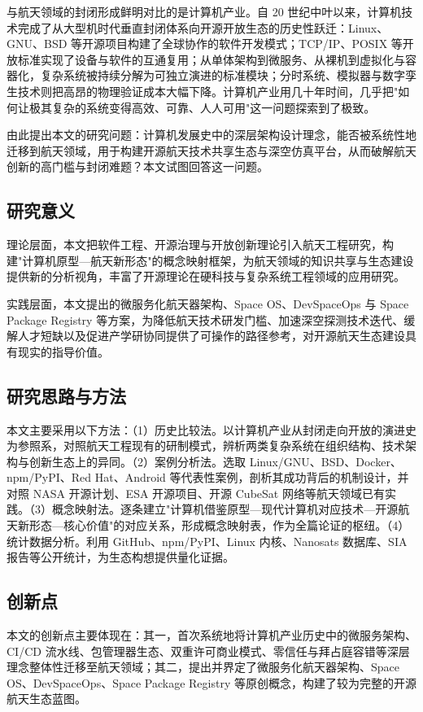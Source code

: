\documentclass[UTF8,a4paper,zihao=-4]{ctexart}
\begin{document}
与航天领域的封闭形成鲜明对比的是计算机产业。自 20 世纪中叶以来，计算机技术完成了从大型机时代垂直封闭体系向开源开放生态的历史性跃迁：Linux、GNU、BSD 等开源项目构建了全球协作的软件开发模式；TCP/IP、POSIX 等开放标准实现了设备与软件的互通复用；从单体架构到微服务、从裸机到虚拟化与容器化，复杂系统被持续分解为可独立演进的标准模块；分时系统、模拟器与数字孪生技术则把高昂的物理验证成本大幅下降。计算机产业用几十年时间，几乎把"如何让极其复杂的系统变得高效、可靠、人人可用"这一问题探索到了极致。

由此提出本文的研究问题：计算机发展史中的深层架构设计理念，能否被系统性地迁移到航天领域，用于构建开源航天技术共享生态与深空仿真平台，从而破解航天创新的高门槛与封闭难题？本文试图回答这一问题。

\subsection{研究意义}
理论层面，本文把软件工程、开源治理与开放创新理论引入航天工程研究，构建"计算机原型—航天新形态"的概念映射框架，为航天领域的知识共享与生态建设提供新的分析视角，丰富了开源理论在硬科技与复杂系统工程领域的应用研究。

实践层面，本文提出的微服务化航天器架构、Space OS、DevSpaceOps 与 Space Package Registry 等方案，为降低航天技术研发门槛、加速深空探测技术迭代、缓解人才短缺以及促进产学研协同提供了可操作的路径参考，对开源航天生态建设具有现实的指导价值。

\subsection{研究思路与方法}
本文主要采用以下方法：（1）历史比较法。以计算机产业从封闭走向开放的演进史为参照系，对照航天工程现有的研制模式，辨析两类复杂系统在组织结构、技术架构与创新生态上的异同。（2）案例分析法。选取 Linux/GNU、BSD、Docker、npm/PyPI、Red Hat、Android 等代表性案例，剖析其成功背后的机制设计，并对照 NASA 开源计划、ESA 开源项目、开源 CubeSat 网络等航天领域已有实践。（3）概念映射法。逐条建立"计算机借鉴原型—现代计算机对应技术—开源航天新形态—核心价值"的对应关系，形成概念映射表，作为全篇论证的枢纽。（4）统计数据分析。利用 GitHub、npm/PyPI、Linux 内核、Nanosats 数据库、SIA 报告等公开统计，为生态构想提供量化证据。

\subsection{创新点}
本文的创新点主要体现在：其一，首次系统地将计算机产业历史中的微服务架构、CI/CD 流水线、包管理器生态、双重许可商业模式、零信任与拜占庭容错等深层理念整体性迁移至航天领域；其二，提出并界定了微服务化航天器架构、Space OS、DevSpaceOps、Space Package Registry 等原创概念，构建了较为完整的开源航天生态蓝图。
\end{document}
